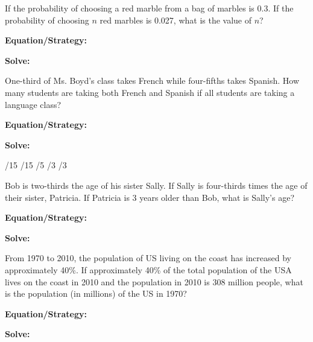 \vfill
\newpage
\begin{multicols*}{2}
\begin{outline}[enumerate]
\medium

\1 If the probability of choosing a red marble from a bag of marbles is 0.3. If the probability of choosing $n$ red marbles is 0.027, what is the value of $n$?

\bigskip
\textbf{Equation/Strategy:} \hrulefill

\bigskip
\textbf{Solve:}

\vfill
{}

\midline

\1 One-third of Ms. Boyd's class takes French while four-fifths takes Spanish. How many students are taking both French and Spanish if all students are taking a language class?

\bigskip
\textbf{Equation/Strategy:} \hrulefill

\bigskip
\textbf{Solve:}

\vfill
{}/15
/15
/5
/3
/3

\columnbreak
\advanced

\1 Bob is two-thirds the age of his sister Sally. If Sally is four-thirds times the age of their sister, Patricia. If Patricia is 3 years older than Bob, what is Sally's age?

\bigskip
\textbf{Equation/Strategy:} \hrulefill

\bigskip
\textbf{Solve:}

\vfill
{}

\midline

\1 From 1970 to 2010, the population of US living on the coast has increased by approximately 40\%. If approximately 40\% of the total population of the USA lives on the coast in 2010 and the population in 2010 is 308 million people, what is the population (in millions) of the US in 1970?

\bigskip
\textbf{Equation/Strategy:} \hrulefill

\bigskip
\textbf{Solve:}

\vfill
{}
\end{outline}
\end{multicols*}